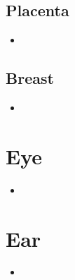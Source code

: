 \subsection{Placenta}
\begin{center}
\end{center}
\begin{multicols}{2}
\begin{itemize}
  \item 
\end{itemize}
\end{multicols}

\subsection{Breast}
\begin{center}
\end{center}
\begin{multicols}{2}
\begin{itemize}
  \item 
\end{itemize}
\end{multicols}

\section{Eye}
\begin{center}
\end{center}
\begin{multicols}{2}
\begin{itemize}
  \item 
\end{itemize}
\end{multicols}

\section{Ear}
\begin{center}
\end{center}
\begin{multicols}{2}
\begin{itemize}
  \item 
\end{itemize}
\end{multicols}

